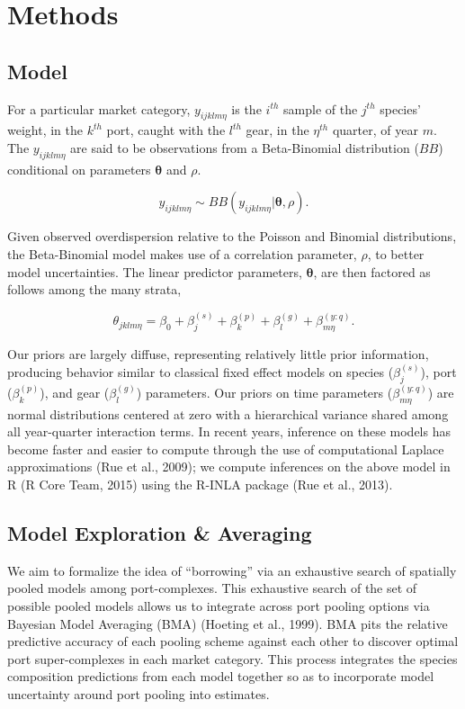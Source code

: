 \documentclass[12pt]{article}
\begin{document}
%
%

%
\section{Methods}\label{methods}

%
\subsection{Model}\label{model}

%
For a particular market category, \(y_{ijklm\eta}\) is the \(i^{th}\)
sample of the \(j^{th}\) species' weight, in the \(k^{th}\) port, caught
with the \(l^{th}\) gear, in the \(\eta^{th}\) quarter, of year \(m\).
The \(y_{ijklm\eta}\) are said to be observations from a Beta-Binomial
distribution (\(BB\)) conditional on parameters \(\bm{\theta}\) and \(\rho\).

\[y_{ijklm\eta} \sim BB(y_{ijklm\eta}|\bm{\theta}, \rho).\]

Given observed overdispersion relative to the Poisson and Binomial
distributions, the Beta-Binomial model makes use of a correlation
parameter, \(\rho\), to better model uncertainties. The linear predictor
parameters, \(\bm{\theta}\), are then factored as follows among the many
strata,

\[\theta_{jklm\eta} = \beta_0 + \beta^{(s)}_j + \beta^{(p)}_k + \beta^{(g)}_l + \beta^{(y:q)}_{m\eta}.\]

Our priors are largely diffuse, representing relatively little prior
information, producing behavior similar to classical fixed effect models
on species (\(\beta^{(s)}_{j}\)), port (\(\beta^{(p)}_{k}\)), and gear
(\(\beta^{(g)}_{l}\)) parameters. Our priors on time parameters
(\(\beta^{(y:q)}_{m\eta}\)) are normal distributions centered at zero
with a hierarchical variance shared among all year-quarter interaction
terms. In recent years, inference on these models has become faster and
easier to compute through the use of computational Laplace
approximations (Rue et al., 2009); we compute inferences on the above
model in R (R Core Team, 2015) using the R-INLA package (Rue et al.,
2013).

%
%

%
\subsection{Model Exploration \& Averaging}\label{model-exploration-averaging}

%
We aim to formalize the idea of ``borrowing'' via an exhaustive search
of spatially pooled models among port-complexes. This exhaustive search of the 
set of possible pooled models allows us to integrate across port pooling 
options via Bayesian Model Averaging (BMA) (Hoeting et al., 1999).
BMA pits the relative predictive accuracy of each pooling scheme against each 
other to discover optimal port super-complexes in each market category. This
process integrates the species composition predictions from each model
together so as to incorporate model uncertainty around port pooling into
estimates. %
\end{document}

